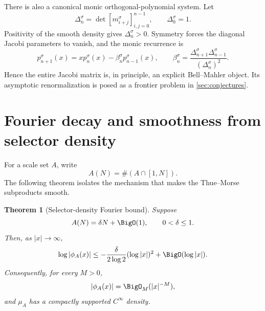 \documentclass[11pt,oneside]{article}
\numberwithin{equation}{section}
\newtheorem{theorem}{Theorem}[section]
\theoremstyle{definition}
\theoremstyle{remark}
\begin{document}
There is also a canonical monic orthogonal-polynomial system.  Let
\begin{equation}
 \Delta_n^\sigma=\det[m_{i+j}^\sigma]_{i,j=0}^{n-1},
 \qquad \Delta_0^\sigma=1.
 \label{eq:Hankel}
\end{equation}
Positivity of the smooth density gives $\Delta_n^\sigma>0$.  Symmetry forces the diagonal
Jacobi parameters to vanish, and the monic recurrence is
\begin{equation}
 p_{n+1}^\sigma(x)=x p_n^\sigma(x)-\beta_n^\sigma p_{n-1}^\sigma(x),
 \qquad
 \beta_n^\sigma=\frac{\Delta_{n+1}^\sigma\Delta_{n-1}^\sigma}
 {(\Delta_n^\sigma)^2}.
 \label{eq:Jacobi}
\end{equation}
Hence the entire Jacobi matrix is, in principle, an explicit Bell--Mahler object.  Its
asymptotic renormalization is posed as a frontier problem in \cref{sec:conjectures}.

\section{Fourier decay and smoothness from selector density}
\label{sec:smoothness}

For a scale set $A$, write
\begin{equation}
 A(N)=\#(A\cap[1,N]).
 \label{eq:counting-A}
\end{equation}
The following theorem isolates the mechanism that makes the Thue--Morse subproducts
smooth.

\begin{theorem}[Selector-density Fourier bound]
\label{thm:selector-Fourier}
Suppose
\begin{equation}
 A(N)=\delta N+\BigO(1),\qquad 0<\delta\le1.
 \label{eq:bounded-discrepancy}
\end{equation}
Then, as $|x|\to\infty$,
\begin{equation}
 \log|\phi_A(x)|
 \le-\frac{\delta}{2\log2}(\log|x|)^2+\BigO(\log|x|).
 \label{eq:Fourier-bound}
\end{equation}
Consequently, for every $M>0$,
\begin{equation}
 |\phi_A(x)|=\BigO_M(|x|^{-M}),
 \label{eq:rapid-decay}
\end{equation}
and $\mu_A$ has a compactly supported $C^\infty$ density.
\end{theorem}
\end{document}
